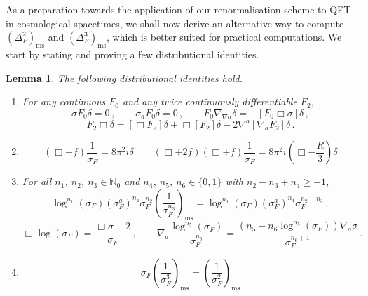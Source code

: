 \documentclass[a4paper,10pt,twoside]{article}
\numberwithin{equation}{section}
\newcounter{and}
\def\bbN{\mathbb{N}}
\def\ms{\mathrm{ms}}
\theoremstyle{plain}
\newtheorem{lem}[theo]{Lemma}
\theoremstyle{definition}
\begin{document}
As a preparation towards the application of our renormalisation scheme to QFT in cosmological spacetimes, we shall now derive an alternative way to compute $\left(\Delta^2_F\right)_\ms$ and $\left(\Delta^3_F\right)_\ms$, which is better suited for practical computations. We start by stating and proving a few distributional identities.
\begin{lem}\label{lem_productidentities}The following distributional identities hold.
\begin{enumerate}
\item For any continuous $F_0$ and any twice continuously differentiable $F_2$, 
$$\sigma F_0 \delta = 0\,,\qquad \sigma_a F_0 \delta = 0\,,\qquad F_0\nabla_{\nabla\sigma}\delta =-[F_0 \Box \sigma]\delta\,,$$ 
$$F_2 \Box\delta=[\Box F_2]\delta+\Box [F_2]\delta - 2\nabla^a[\nabla_aF_2]\delta\,.$$
\item $$(\Box+f)\frac{1}{\sigma_F}=8\pi^2i\delta\qquad(\Box+2f)(\Box+f)\frac{1}{\sigma_F}=8\pi^2i\left(\Box-\frac R3\right)\delta$$
\item For all $n_1$, $n_2$, $n_3\in\bbN_0$ and $n_4$, $n_5$, $n_6\in\{0,1\}$ with $n_2-n_3+n_4\ge-1$,  $$\log^{n_1}\!\!\left(\sigma_F\right)(\sigma^a_F)^{n_4} \sigma^{n_2}_F \left(\frac{1}{\sigma_F^{n_3}}\right)_\ms= \log^{n_1}\!\!\left(\sigma_F\right) (\sigma^a_F)^{n_4}\sigma^{n_2-n_3}_F\,,$$
$$\Box \log (\sigma_F) = \frac{\Box \sigma -2}{\sigma_F}\,,\qquad \nabla_a\frac{\log^{n_5}(\sigma_F)}{\sigma^{n_6}_F}=\frac{\left(n_5-n_6\log^{n_5} (\sigma_F)\right)\nabla_a \sigma}{\sigma^{n_6+1}_F}\,.$$ 
\item $$\sigma_F \left(\frac{1}{\sigma_F^3}\right)_\ms=\left(\frac{1}{\sigma_F^2}\right)_\ms$$
\end{enumerate}
\end{lem}
\end{document}
